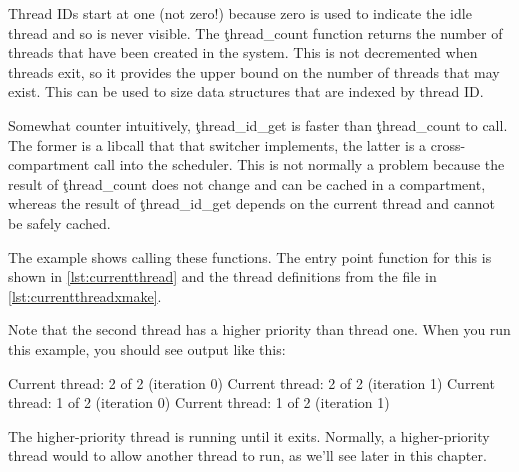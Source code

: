 
Thread IDs start at one (not zero!) because zero is used to indicate the idle thread and so is never visible.
The \c{thread_count} function returns the number of threads that have been created in the system.
This is not decremented when threads exit, so it provides the upper bound on the number of threads that may exist.
This can be used to size data structures that are indexed by thread ID.


\begin{caution}
	Somewhat counter intuitively, \c{thread_id_get} is faster than \c{thread_count} to call.
	The former is a libcall that that switcher implements, the latter is a cross-compartment call into the scheduler.
	This is not normally a problem because the result of \c{thread_count} does not change and can be cached in a compartment, whereas the result of \c{thread_id_get} depends on the current thread and cannot be safely cached.
\end{caution}

The  example shows calling these functions.
The entry point function for this is shown in \ref{lst:currentthread} and the thread definitions from the  file in \ref{lst:currentthreadxmake}.

\codelisting[filename=examples/current_thread/current.cc,marker=entry,label=lst:currentthread,caption="A simple example that prints the current thread"]{}

\lualisting[filename=examples/current_thread/xmake.lua,marker=threads,label=lst:currentthreadxmake,caption="The thread definitions for the current-thread example"]{}

Note that the second thread has a higher priority than thread one.
When you run this example, you should see output like this:

\begin{console}
Current thread: 2 of 2 (iteration 0)
Current thread: 2 of 2 (iteration 1)
Current thread: 1 of 2 (iteration 0)
Current thread: 1 of 2 (iteration 1)
\end{console}

The higher-priority thread is running until it exits.
Normally, a higher-priority thread would  to allow another thread to run, as we'll see later in this chapter.


